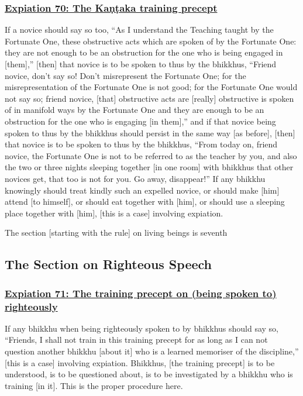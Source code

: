 \subsubsection*{\hyperref[pac70]{Expiation 70: The Kaṇṭaka training precept}}
\label{exp70}
If a novice should say so too, ``As I understand the Teaching taught by the Fortunate One, these obstructive acts which are spoken of by the Fortunate One: they are not enough to be an obstruction for the one who is being engaged in [them],'' [then] that novice is to be spoken to thus by the bhikkhus, ``Friend novice, don't say so! Don't misrepresent the Fortunate One; for the misrepresentation of the Fortunate One is not good; for the Fortunate One would not say so; friend novice, [that] obstructive acts are [really] obstructive is spoken of in manifold ways by the Fortunate One and they are enough to be an obstruction for the one who is engaging [in them],'' and if that novice being spoken to thus by the bhikkhus should persist in the same way [as before], [then] that novice is to be spoken to thus by the bhikkhus, ``From today on, friend novice, the Fortunate One is not to be referred to as the teacher by you, and also the two or three nights sleeping together [in one room] with bhikkhus that other novices get, that too is not for you. Go away, disappear!'' If any bhikkhu knowingly should treat kindly such an expelled novice, or should make [him] attend [to himself], or should eat together with [him], or should use a sleeping place together with [him], [this is a case] involving expiation.

\begin{center}
  The section [starting with the rule] on living beings is seventh
\end{center}

\setsubsecheadstyle{\subsectionFmt}
\subsection{The Section on Righteous Speech}
\vspace{0.2cm}

\subsubsection*{\hyperref[pac71]{Expiation 71: The training precept on (being spoken to) righteously}}
\label{exp71}
If any bhikkhu when being righteously spoken to by bhikkhus should say so, ``Friends, I shall not train in this training precept for as long as I can not question another bhikkhu [about it] who is a learned memoriser of the discipline,'' [this is a case] involving expiation. Bhikkhus, [the training precept] is to be understood, is to be questioned about, is to be investigated by a bhikkhu who is training [in it]. This is the proper procedure here.

